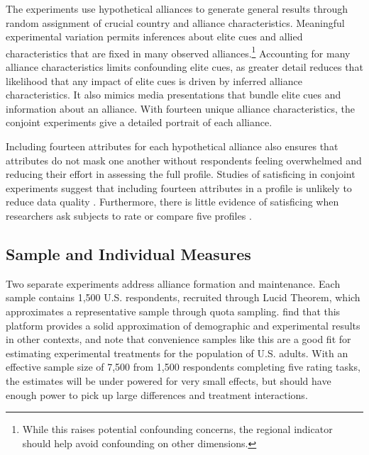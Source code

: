 \documentclass[12pt]{article}
\begin{document}
The experiments use hypothetical alliances to generate general results through random assignment of crucial country and alliance characteristics. 
Meaningful experimental variation permits inferences about elite cues and allied characteristics that are fixed in many observed alliances.\footnote{While this raises potential confounding concerns, the regional indicator should help avoid confounding on other dimensions.}
Accounting for many alliance characteristics limits confounding elite cues, as greater detail reduces that likelihood that any impact of elite cues is driven by inferred alliance characteristics.
It also mimics media presentations that bundle elite cues and information about an alliance. 
With fourteen unique alliance characteristics, the conjoint experiments give a detailed portrait of each alliance.


Including fourteen attributes for each hypothetical alliance also ensures that attributes do not mask one another without respondents feeling overwhelmed and reducing their effort in assessing the full profile.
Studies of satisficing in conjoint experiments suggest that including fourteen attributes in a profile is unlikely to reduce data quality \citep{Bansaketal2019}. 
Furthermore, there is little evidence of satisficing when researchers ask subjects to rate or compare five profiles \citep{Bansaketal2018}.



\subsection{Sample and Individual Measures}


Two separate experiments address alliance formation and maintenance. 
Each sample contains 1,500 U.S. respondents, recruited through Lucid Theorem, which approximates a representative sample through quota sampling.
\citet{CoppockMcClellan2019} find that this platform provides a solid approximation of demographic and experimental results in other contexts, and note that convenience samples like this are a good fit for estimating experimental treatments for the population of U.S. adults.
With an effective sample size of 7,500 from 1,500 respondents completing five rating tasks, the estimates will be under powered for very small effects, but should have enough power to pick up large differences and treatment interactions. 
\end{document}
